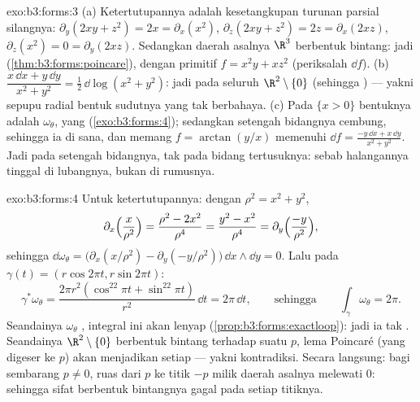 \begin{solution}{exo:b3:forms:3}
(a) Ketertutupannya adalah kesetangkupan turunan parsial silangnya:
$\partial_y(2xy + z^2) = 2x = \partial_x(x^2)$,
$\partial_z(2xy + z^2) = 2z = \partial_x(2xz)$,
$\partial_z(x^2) = 0 = \partial_y(2xz)$. Sedangkan daerah asalnya $\R^3$
berbentuk bintang: jadi  (\cref{thm:b3:forms:poincare}), dengan
primitif $f = x^2y + xz^2$ (periksalah $\dd f$).
(b) $\dfrac{x\,\dd x + y\,\dd y}{x^2 + y^2} =
\tfrac12\,\dd\log(x^2 + y^2)$: jadi  pada seluruh
$\R^2\setminus\{0\}$ (sehingga ) --- yakni sepupu radial
bentuk sudutnya yang tak berbahaya.
(c) Pada $\{x > 0\}$ bentuknya adalah $\omega_\theta$, yang 
(\cref{exo:b3:forms:4}); sedangkan setengah bidangnya cembung, sehingga ia
 di sana, dan memang $f = \arctan(y/x)$ memenuhi $\dd f
= \frac{-y\,\dd x + x\,\dd y}{x^2 + y^2}$. Jadi  pada
setengah bidangnya, tak  pada bidang tertusuknya: sebab
halangannya tinggal di lubangnya, bukan di rumusnya.
\end{solution}

\begin{solution}{exo:b3:forms:4}
Untuk ketertutupannya: dengan $\rho^2 = x^2 + y^2$,
\[
\partial_x\Bigl(\frac{x}{\rho^2}\Bigr) = \frac{\rho^2 -
2x^2}{\rho^4} = \frac{y^2 - x^2}{\rho^4} =
\partial_y\Bigl(\frac{-y}{\rho^2}\Bigr),
\]
sehingga $\dd\omega_\theta = \bigl(\partial_x(x/\rho^2) -
\partial_y(-y/\rho^2)\bigr)\,\dd x\wedge\dd y = 0$. Lalu pada
$\gamma(t) = (r\cos2\pi t, r\sin2\pi t)$:
\[
\gamma^*\omega_\theta = \frac{2\pi r^2(\cos^22\pi t +
\sin^22\pi t)}{r^2}\,\dd t = 2\pi\,\dd t,
\qquad\text{sehingga}\qquad
\int_\gamma\omega_\theta = 2\pi .
\] Seandainya $\omega_\theta$
, integral ini akan lenyap
(\cref{prop:b3:forms:exactloop}): jadi ia tak . Seandainya
$\R^2\setminus\{0\}$ berbentuk bintang terhadap suatu $p$,
lema Poincaré (yang digeser ke $p$) akan menjadikan setiap
  --- yakni kontradiksi. Secara langsung: bagi sembarang $p
\neq 0$, ruas dari $p$ ke titik $-p$ milik
daerah asalnya melewati $0$: sehingga sifat berbentuk bintangnya gagal pada setiap
titiknya.
\end{solution}

